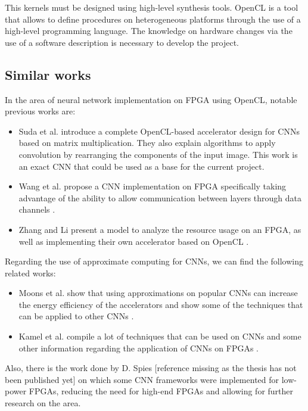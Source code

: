 This kernels must be designed using high-level synthesis tools. OpenCL is a tool that allows to define 
procedures on heterogeneous platforms through the 
use of a high-level programming language. The knowledge on hardware changes via the use of a software 
description is necessary to develop the project.

\subsection{Similar works}

In the area of neural network implementation on FPGA using OpenCL, notable previous works are:
\begin{itemize}
    \item Suda et al. introduce a complete OpenCL-based accelerator design for CNNs based on
    matrix multiplication. They also explain algorithms to apply convolution by rearranging
    the components of the input image. This work is an exact CNN that could be used as a base
    for the current project. \cite{suda}
    \item Wang et al. propose a CNN implementation on FPGA specifically taking advantage of 
    the ability to allow communication between layers through data channels \cite{pipecnn}.
    \item Zhang and Li present a model to analyze the resource usage on an FPGA, as well as
    implementing their own accelerator based on OpenCL \cite{zhangcnn}.
\end{itemize}

Regarding the use of approximate computing for CNNs, we can find the following related works:
\begin{itemize}
    \item Moons et al. show that using approximations on popular CNNs can increase the energy
    efficiency of the accelerators and show some of the techniques that can be applied to other
    CNNs \cite{moons}.
    \item Kamel et al. compile a lot of techniques that can be used on CNNs and some other 
    information regarding the application of CNNs on FPGAs \cite{kamel}.
\end{itemize}

Also, there is the work done by D. Spies [reference missing as the thesis has not been published yet]
on which some CNN frameworks were implemented for low-power FPGAs, reducing the need for high-end
FPGAs and allowing for further research on the area.

